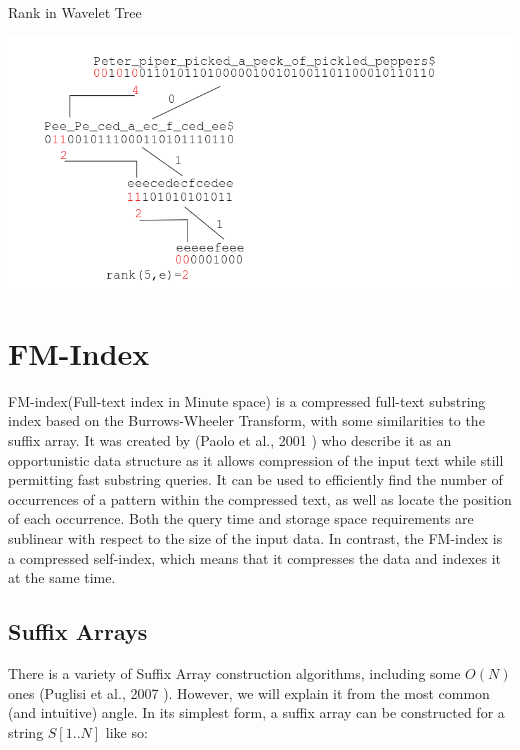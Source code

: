 \begin{table}[!htp]
  \caption{Rank in Wavelet Tree}
  \label{ex:riwt}
  \begin{center}
    \includegraphics[width=1\textwidth]{Figures/graph2.png}
  \end{center}
\end{table}

\section{FM-Index}

FM-index(Full-text index in Minute space) is a compressed full-text substring index based on the Burrows-Wheeler Transform, with some similarities to the suffix array. It was created by (Paolo et al., 2001 \cite{paolo2001}) who describe it as an opportunistic data structure as it allows compression of the input text while still permitting fast substring queries.
It can be used to efficiently find the number of occurrences of a pattern within the compressed text, as well as locate the position of each occurrence. Both the query time and storage space requirements are sublinear with respect to the size of the input data. In contrast, the FM-index is a compressed self-index, which means that it compresses the data and indexes it at the same time.

\subsection{Suffix Arrays}

There is a variety of Suffix Array construction algorithms, including some \(O(N)\) ones (Puglisi et al., 2007 \cite{puglisi2007}). However, we will explain it from the most common (and intuitive) angle. In its simplest form, a suffix array can be constructed for a string \(S[1..N]\) like so:

